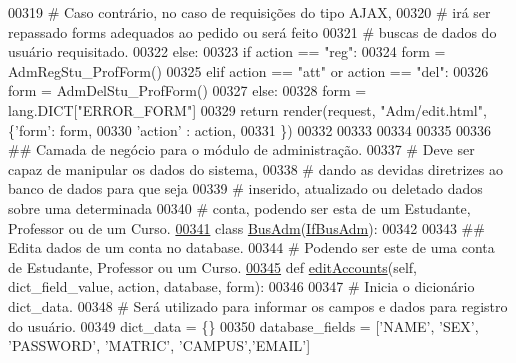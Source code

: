 \begin{DoxyCode}
00319             \textcolor{comment}{# Caso contrário, no caso de requisições do tipo AJAX, }
00320             \textcolor{comment}{#   irá ser repassado forms adequados ao pedido ou será feito}
00321             \textcolor{comment}{#   buscas de dados do usuário requisitado.}
00322             \textcolor{keywordflow}{else}:
00323                 \textcolor{keywordflow}{if} action == \textcolor{stringliteral}{"reg"}:
00324                     form = AdmRegStu\_ProfForm()
00325                 \textcolor{keywordflow}{elif} action == \textcolor{stringliteral}{"att"} \textcolor{keywordflow}{or} action == \textcolor{stringliteral}{"del"}:
00326                     form = AdmDelStu\_ProfForm()
00327                 \textcolor{keywordflow}{else}:
00328                     form = lang.DICT[\textcolor{stringliteral}{"ERROR\_FORM"}]
00329                 \textcolor{keywordflow}{return} render(request, \textcolor{stringliteral}{"Adm/edit.html"}, \{\textcolor{stringliteral}{'form'}: form,
00330                                                          \textcolor{stringliteral}{'action'} : action,
00331                                                         \})
00332 
00333 
00334 
00335 
00336 \textcolor{comment}{## Camada de negócio para o módulo de administração.}
00337 \textcolor{comment}{#   Deve ser capaz de manipular os dados do sistema,}
00338 \textcolor{comment}{#   dando as devidas diretrizes ao banco de dados para que seja}
00339 \textcolor{comment}{#   inserido, atualizado ou deletado dados sobre uma determinada}
00340 \textcolor{comment}{#   conta, podendo ser esta de um Estudante, Professor ou de um Curso.}
\hypertarget{AdmUnit_8py_source_l00341}{}\hyperlink{classAdm_1_1AdmUnit_1_1BusAdm}{00341} \textcolor{keyword}{class }\hyperlink{classAdm_1_1AdmUnit_1_1BusAdm}{BusAdm}(\hyperlink{classAdm_1_1AdmUnit_1_1IfBusAdm}{IfBusAdm}): 
00342 
00343     \textcolor{comment}{## Edita dados de um conta no database.}
00344     \textcolor{comment}{#   Podendo ser este de uma conta de Estudante, Professor ou um Curso.}
\hypertarget{AdmUnit_8py_source_l00345}{}\hyperlink{classAdm_1_1AdmUnit_1_1BusAdm_a54984f999b27cdce51914ed05cd7cb42}{00345}     \textcolor{keyword}{def }\hyperlink{classAdm_1_1AdmUnit_1_1BusAdm_a54984f999b27cdce51914ed05cd7cb42}{editAccounts}(self, dict\_field\_value, action, database, form):
00346         
00347         \textcolor{comment}{# Inicia o dicionário dict\_data.}
00348         \textcolor{comment}{#   Será utilizado para informar os campos e dados para registro do usuário.}
00349         dict\_data = \{\}
00350         database\_fields = [\textcolor{stringliteral}{'NAME'}, \textcolor{stringliteral}{'SEX'}, \textcolor{stringliteral}{'PASSWORD'}, \textcolor{stringliteral}{'MATRIC'}, \textcolor{stringliteral}{'CAMPUS'},\textcolor{stringliteral}{'EMAIL'}]

\end{DoxyCode}
